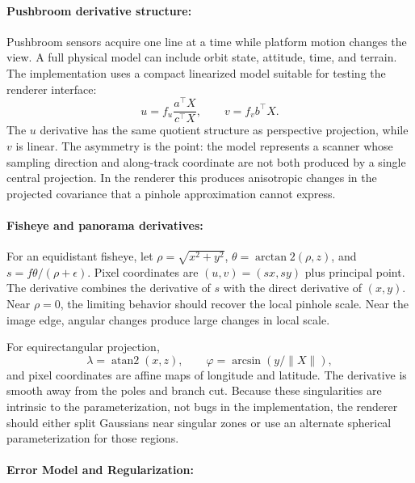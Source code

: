 \documentclass{article}
\begin{document}
\paragraph{Pushbroom derivative structure:}

Pushbroom sensors acquire one line at a time while platform motion changes the view. A full physical model can include orbit state, attitude, time, and terrain. The implementation uses a compact linearized model suitable for testing the renderer interface:
\begin{equation}
  u = f_u\frac{a^\top X}{c^\top X}, \qquad v = f_v b^\top X.
\end{equation}
The $u$ derivative has the same quotient structure as perspective projection, while $v$ is linear. The asymmetry is the point: the model represents a scanner whose sampling direction and along-track coordinate are not both produced by a single central projection. In the renderer this produces anisotropic changes in the projected covariance that a pinhole approximation cannot express.

\paragraph{Fisheye and panorama derivatives:}

For an equidistant fisheye, let $\rho=\sqrt{x^2+y^2}$, $\theta=\arctan2(\rho,z)$, and $s=f\theta/(\rho+\epsilon)$. Pixel coordinates are $(u,v)=(s x, s y)$ plus principal point. The derivative combines the derivative of $s$ with the direct derivative of $(x,y)$. Near $\rho=0$, the limiting behavior should recover the local pinhole scale. Near the image edge, angular changes produce large changes in local scale.

For equirectangular projection,
\begin{equation}
  \lambda=\operatorname{atan2}(x,z), \qquad \varphi=\arcsin(y/\|X\|),
\end{equation}
and pixel coordinates are affine maps of longitude and latitude. The derivative is smooth away from the poles and branch cut. Because these singularities are intrinsic to the parameterization, not bugs in the implementation, the renderer should either split Gaussians near singular zones or use an alternate spherical parameterization for those regions.

\paragraph{Error Model and Regularization:}
\end{document}

